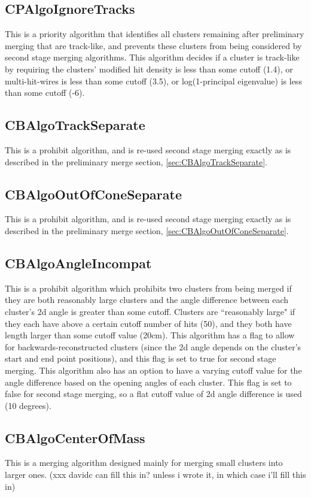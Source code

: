 \documentclass{article}
\begin{document}
\subsection{CPAlgoIgnoreTracks}\label{sec:CPAlgoIgnoreTracks}
This is a priority algorithm that identifies all clusters remaining after preliminary merging that are track-like, and prevents these clusters from being considered by second stage merging algorithms. This algorithm decides if a cluster is track-like by requiring the clusters' modified hit density is less than some cutoff (1.4), or multi-hit-wires is less than some cutoff (3.5), or log(1-principal eigenvalue) is less than some cutoff (-6).

\subsection{CBAlgoTrackSeparate}
This is a prohibit algorithm, and is re-used second stage merging exactly as is described in the preliminary merge section, \autoref{sec:CBAlgoTrackSeparate}.

\subsection{CBAlgoOutOfConeSeparate}
This is a prohibit algorithm, and is re-used second stage merging exactly as is described in the preliminary merge section, \autoref{sec:CBAlgoOutOfConeSeparate}.

\subsection{CBAlgoAngleIncompat}\label{sec:CBAlgoAngleIncompat}
This is a prohibit algorithm which prohibits two clusters from being merged if they are both reasonably large clusters and the angle difference between each cluster's 2d angle is greater than some cutoff. Clusters are ``reasonably large" if they each have above a certain cutoff number of hits (50), and they both have length larger than some cutoff value (20cm). This algorithm has a flag to allow for backwards-reconstructed clusters (since the 2d angle depends on the cluster's start and end point positions), and this flag is set to true for second stage merging. This algorithm also has an option to have a varying cutoff value for the angle difference based on the opening angles of each cluster. This flag is set to false for second stage merging, so a flat cutoff value of 2d angle difference is used (10 degrees).

\subsection{CBAlgoCenterOfMass}\label{sec:CBAlgoCenterOfMass}
This is a merging algorithm designed mainly for merging small clusters into larger ones. (xxx davidc can fill this in? unless i wrote it, in which case i'll fill this in)
\end{document}
